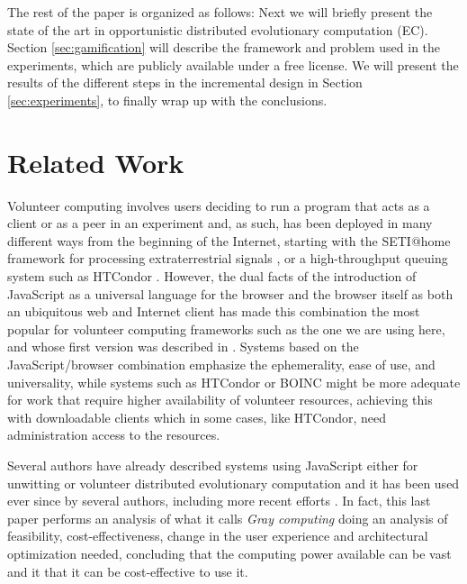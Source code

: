 \documentclass{llncs}
\begin{document}
The rest of the paper is organized as follows: Next we will briefly
present the state of the art in opportunistic distributed evolutionary
computation (EC). Section \ref{sec:gamification} will describe the
framework and problem used in the experiments, which are publicly
available under a free license. We will present the results of the
different steps in the incremental design in Section
\ref{sec:experiments}, to finally wrap up with the conclusions.



\section{Related Work}
\label{sec:soa}

Volunteer computing involves users deciding to run a program that acts
as a client or as a peer in an experiment
and, as such, has been deployed in many different ways from the
beginning of the Internet, starting with the SETI@home framework for
processing extraterrestrial signals \cite{david-seti:home}, or a 
high-throughput queuing system such as HTCondor \cite{HTCondor}.
However,
the dual facts of the introduction of JavaScript as a universal language for the
browser and the browser itself as both an ubiquitous web and Internet client has
made this combination the most popular for volunteer computing
frameworks such as the one we are using here, and whose first version
was described in \cite{DBLP:conf/gecco/GuervosG15}. Systems based on the
JavaScript/browser combination
emphasize the ephemerality, ease of use, and universality, while
systems such as HTCondor or BOINC might be more adequate for work that %
require higher availability of volunteer resources, achieving this
with downloadable clients which in some cases, like HTCondor, need
administration access to the resources.

Several authors have already described systems using JavaScript  either
for unwitting
\cite{unwitting-ec,boldrin2007distributed,apolonia2012enhancing} or volunteer 
\cite{langdon:2005:metas,gecco07:workshop:dcor} distributed
evolutionary computation and it has been used ever since by several
authors, including more recent efforts
\cite{duda2013distributed,DBLP:journals/corr/abs-0801-1210,EvoStar2014:jsEO,martinez2015capataz,pan2015gray}. In fact, this last paper \cite{pan2015gray} performs
an analysis of what it calls {\em Gray computing} doing an analysis of
feasibility, cost-effectiveness, change in the user experience and
architectural optimization needed, concluding that the computing power
available can be vast and it that it can be cost-effective to use it. 
\end{document}
